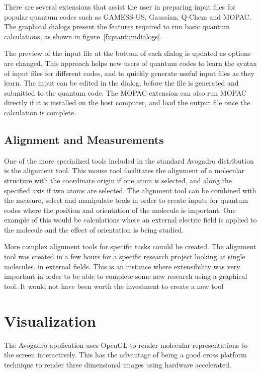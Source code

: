 \documentclass{article}
\begin{document}
There are several extensions that assist the user in preparing input files for popular quantum codes such as GAMESS-US, Gaussian, Q-Chem and MOPAC. The graphical dialogs present the features required to run basic quantum calculations, as shown in figure~\ref{f:quantumdialogs}.

The preview of the input file at the bottom of each dialog is updated as options are changed. This approach helps new users of quantum codes to learn the syntax of input files for different codes, and to quickly generate useful input files as they learn. The input can be edited in the dialog, before the file is generated and submitted to the quantum code. The MOPAC extension can also run MOPAC directly if it is installed on the host computer, and load the output file once the calculation is complete.

\subsection{Alignment and Measurements}

One of the more specialized tools included in the standard Avogadro distribution is the alignment tool. This mouse tool facilitates the alignment of a molecular structure with the coordinate origin if one atom is selected, and along the specified axis if two atoms are selected. The alignment tool can be combined with the measure, select and manipulate tools in order to create inputs for quantum codes where the position and orientation of the molecule is important. One example of this would be calculations where an external electric field is applied to the molecule and the effect of orientation is being studied.

More complex alignment tools for specific tasks couuld be created. The alignment tool was created in a few hours for a specific research project looking at single molecules. in external fields. This is an instance where extensibility was very important in order to be able to complete some new research using a graphical tool. It would not have been worth the investment to create a new tool 


\section{Visualization}

The Avogadro application uses OpenGL to render molecular representations to the screen interactively. This has the advantage of being a good cross platform technique to render three dimensional images using hardware accelerated. 
\end{document}
